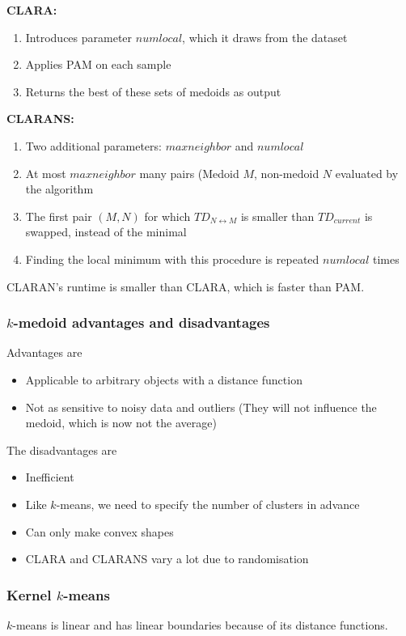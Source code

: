     \textbf{CLARA:}
    \begin{enumerate}
        \item Introduces parameter $numlocal$, which it draws from the dataset
        \item Applies PAM on each sample
        \item Returns the best of these sets of medoids as output
    \end{enumerate}
    \textbf{CLARANS:}
    \begin{enumerate}
        \item Two additional parameters: $maxneighbor$ and $numlocal$
        \item At most $maxneighbor$ many pairs (Medoid $M$, non-medoid $N$ evaluated by the algorithm
        \item The first pair $(M, N)$ for which $TD_{N \leftrightarrow M}$ is smaller than $TD_{current}$ is swapped, instead of the minimal
        \item Finding the local minimum with this procedure is repeated $numlocal$ times
    \end{enumerate}
    CLARAN's runtime is smaller than CLARA, which is faster than PAM.
    
    
\subsubsection{$k$-medoid advantages and disadvantages}
    Advantages are
    \begin{itemize}
        \item Applicable to arbitrary objects with a distance function
        \item Not as sensitive to noisy data and outliers (They will not influence the medoid, which is now not the average)
    \end{itemize}
    The disadvantages are
    \begin{itemize}
        \item Inefficient
        \item Like $k$-means, we need to specify the number of clusters in advance
        \item Can only make convex shapes
        \item CLARA and CLARANS vary a lot due to randomisation
    \end{itemize}
    
    
\subsubsection{Kernel $k$-means}
    $k$-means is linear and has linear boundaries because of its distance functions. 
    
